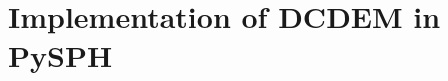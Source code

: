 \chapter{Implementation of DCDEM in PySPH}\label{appendix2}
\inputminted[fontsize=\scriptsize]{python}{DCDEM.py}

